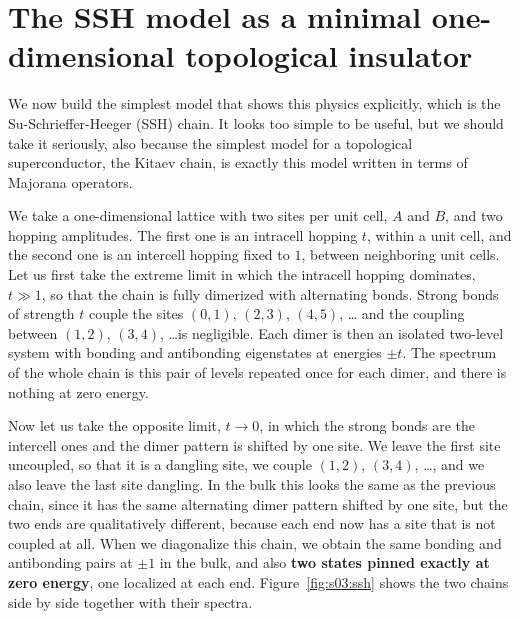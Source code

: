 \section{The SSH model as a minimal one-dimensional topological insulator}

We now build the simplest model that shows this physics explicitly, which is the
Su-Schrieffer-Heeger (SSH) chain. It looks too simple to be useful, but we should take it seriously,
also because the simplest model for a topological superconductor, the Kitaev chain, is exactly this
model written in terms of Majorana operators.

We take a one-dimensional lattice with two sites per unit cell, $A$ and $B$, and two hopping
amplitudes. The first one is an intracell hopping $t$, within a unit cell, and the second one is an
intercell hopping fixed to $1$, between neighboring unit cells. Let us first take the extreme limit in
which the intracell hopping dominates, $t \gg 1$, so that the chain is fully dimerized with
alternating bonds. Strong bonds of strength $t$ couple the sites $(0,1)$, $(2,3)$, $(4,5)$, \ldots
and the coupling between $(1,2)$, $(3,4)$, \ldots is negligible. Each dimer is then an isolated
two-level system with bonding and antibonding eigenstates at energies $\pm t$. The spectrum of the
whole chain is this pair of levels repeated once for each dimer, and there is nothing at zero energy.

Now let us take the opposite limit, $t \to 0$, in which the strong bonds are the intercell ones and
the dimer pattern is shifted by one site. We leave the first site uncoupled, so that it is a dangling
site, we couple $(1,2)$, $(3,4)$, \ldots, and we also leave the last site dangling. In the bulk this
looks the same as the previous chain, since it has the same alternating dimer pattern shifted by one
site, but the two ends are qualitatively different, because each end now has a site that is not
coupled at all. When we diagonalize this chain, we obtain the same bonding and antibonding pairs at
$\pm 1$ in the bulk, and also \textbf{two states pinned exactly at zero energy}, one localized at each
end. Figure~\ref{fig:s03:ssh} shows the two chains side by side together with their spectra.



